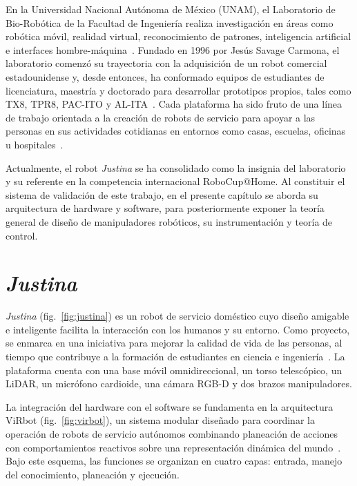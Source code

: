 En la Universidad Nacional Autónoma de México (UNAM), el Laboratorio de Bio-Robótica de la Facultad de Ingeniería realiza investigación en áreas como robótica móvil, realidad virtual, reconocimiento de patrones, inteligencia artificial e interfaces hombre-máquina~\cite{justina_uv}. Fundado en 1996 por Jesús Savage Carmona, el laboratorio comenzó su trayectoria con la adquisición de un robot comercial estadounidense y, desde entonces, ha conformado equipos de estudiantes de licenciatura, maestría y doctorado para desarrollar prototipos propios, tales como TX8, TPR8, PAC-ITO y AL-ITA~\cite{robots_ia_unam}. Cada plataforma ha sido fruto de una línea de trabajo orientada a la creación de robots de servicio para apoyar a las personas en sus actividades cotidianas en entornos como casas, escuelas, oficinas u hospitales~\cite{justina_uv}.

Actualmente, el robot \emph{Justina} se ha consolidado como la insignia del laboratorio y su referente en la competencia internacional RoboCup@Home. Al constituir el sistema de validación de este trabajo, en el presente capítulo se aborda su arquitectura de hardware y software, para posteriormente exponer la teoría general de diseño de manipuladores robóticos, su instrumentación y teoría de control.

\section{\emph{Justina}}

\emph{Justina} (fig.~\ref{fig:justina}) es un robot de servicio doméstico cuyo diseño amigable e inteligente facilita la interacción con los humanos y su entorno. Como proyecto, se enmarca en una iniciativa para mejorar la calidad de vida de las personas, al tiempo que contribuye a la formación de estudiantes en ciencia e ingeniería~\cite{BioRoboticsUNAM}. La plataforma cuenta con una base móvil omnidireccional, un torso telescópico, un LiDAR, un micrófono cardioide, una cámara RGB-D y dos brazos manipuladores. 

La integración del hardware con el software se fundamenta en la arquitectura ViRbot (fig.~\ref{fig:virbot}), un sistema modular diseñado para coordinar la operación de robots de servicio autónomos combinando planeación de acciones con comportamientos reactivos sobre una representación dinámica del mundo~\cite{Savage2007}. Bajo este esquema, las funciones se organizan en cuatro capas: entrada, manejo del conocimiento, planeación y ejecución.


